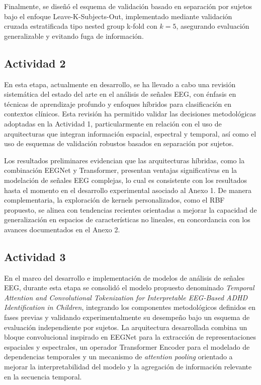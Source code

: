 Finalmente, se diseñó el esquema de validación basado en separación por sujetos bajo el enfoque Leave-K-Subjects-Out, implementado mediante validación cruzada estratificada tipo nested group k-fold con $k=5$, asegurando evaluación generalizable y evitando fuga de información.

\subsection{Actividad 2}

En esta etapa, actualmente en desarrollo, se ha llevado a cabo una revisión sistemática del estado del arte en el análisis de señales EEG, con énfasis en técnicas de aprendizaje profundo y enfoques híbridos para clasificación en contextos clínicos. Esta revisión ha permitido validar las decisiones metodológicas adoptadas en la Actividad 1, particularmente en relación con el uso de arquitecturas que integran información espacial, espectral y temporal, así como el uso de esquemas de validación robustos basados en separación por sujetos.

Los resultados preliminares evidencian que las arquitecturas híbridas, como la combinación EEGNet y Transformer, presentan ventajas significativas en la modelación de señales EEG complejas, lo cual es consistente con los resultados hasta el momento en el desarrollo experimental asociado al Anexo 1. De manera complementaria, la exploración de kernels personalizados, como el RBF propuesto, se alinea con tendencias recientes orientadas a mejorar la capacidad de generalización en espacios de características no lineales, en concordancia con los avances documentados en el Anexo 2.

\subsection{Actividad 3}

En el marco del desarrollo e implementación de modelos de análisis de señales EEG, durante esta etapa se consolidó el modelo propuesto denominado \textit{Temporal Attention and Convolutional Tokenization for Interpretable EEG-Based ADHD Identification in Children}, integrando los componentes metodológicos definidos en fases previas y validando experimentalmente su desempeño bajo un esquema de evaluación independiente por sujetos. La arquitectura desarrollada combina un bloque convolucional inspirado en EEGNet para la extracción de representaciones espaciales y espectrales, un operador Transformer Encoder para el modelado de dependencias temporales y un mecanismo de \textit{attention pooling} orientado a mejorar la interpretabilidad del modelo y la agregación de información relevante en la secuencia temporal.

